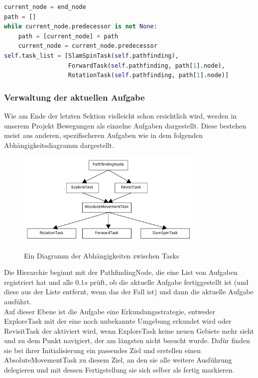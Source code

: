 \begin{lstlisting}[language=python,label={lst:pathfinding}]
current_node = end_node
path = []
while current_node.predecessor is not None:
    path = [current_node] + path
    current_node = current_node.predecessor
self.task_list = [SlamSpinTask(self.pathfinding),
                  ForwardTask(self.pathfinding, path[1].node),
                  RotationTask(self.pathfinding, path[1].node)]
\end{lstlisting}
\subsubsection{Verwaltung der aktuellen Aufgabe} \label{subsubsec:taskmanagement}
Wie am Ende der letzten Sektion vielleicht schon ersichtlich wird, werden in unserem Projekt Bewegungen als einzelne
Aufgaben dargestellt.
Diese bestehen meist aus anderen, spezifischeren Aufgaben wie in dem folgenden Abhängigkeitsdiagramm dargestellt.
\begin{figure}[h]
    \caption{Ein Diagramm der Abhängigkeiten zwischen Tasks}
\includegraphics[width=0.8\textwidth]{img/TaskDiagram}\label{fig:taskdiagram}
\centering
\end{figure}
Die Hierarchie beginnt mit der PathfindingNode, die eine List von Aufgaben registriert hat und alle $0.1s$ prüft, ob die
aktuelle Aufgabe fertiggestellt ist (und diese aus der Liste entfernt, wenn das der Fall ist) und dann die aktuelle
Aufgabe ausführt.\\

Auf dieser Ebene ist die Aufgabe eine Erkundungsstrategie, entweder ExploreTask mit der eine noch unbekannte Umgebung
erkundet wird oder RevisitTask der aktiviert wird, wenn ExploreTask keine neuen Gebiete mehr sieht und zu dem Punkt
navigiert, der am längsten nicht besucht wurde.
Dafür finden sie bei ihrer Initialisierung ein passendes Ziel und erstellen einen AbsoluteMovementTask zu diesem Ziel,
an den sie alle weitere Ausführung delegieren und mit dessen Fertigstellung sie sich selber als fertig markieren.\\

